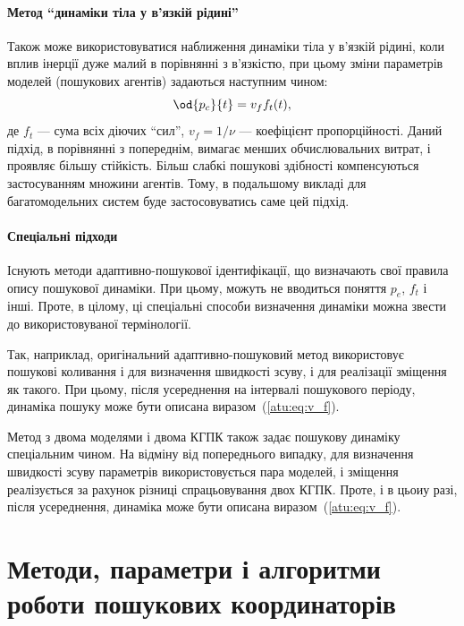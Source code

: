 \paragraph{Метод ``динаміки тіла у в'язкій рідині''}

Також може використовуватися наближення динаміки тіла у в'язкій рідині, коли
вплив інерції дуже малий в порівнянні з в'язкістю, при цьому зміни параметрів
моделей (пошукових агентів) задаються наступним чином:
%
\begin{equation}
  \od{p_c}{t} = v_f f_t(t),
  \label{atu:eq:v_f}
\end{equation}
%
\noindent
де $f_t$ --- сума всіх діючих ``сил'',
$v_f = 1 / \nu$ --- коефіцієнт
пропорційності. Даний підхід, в порівнянні з попереднім, вимагає менших
обчислювальних витрат, і проявляє більшу стійкість. Більш слабкі пошукові
здібності компенсуються застосуванням множини агентів. Тому, в подальшому
викладі для багатомодельних систем буде застосовуватись саме цей підхід.

\paragraph{Спеціальні підходи}

Існують методи адаптивно-пошукової ідентифікації, що визначають
свої правила опису пошукової динаміки. При цьому, можуть не
вводиться поняття
$ p_e $,
$ f_t $ і інші. Проте, в цілому, ці спеціальні способи визначення
динаміки можна звести до використовуваної термінології.

Так, наприклад, оригінальний адаптивно-пошуковий метод
використовує пошукові коливання і для визначення швидкості
зсуву, і для реалізації зміщення як такого. При цьому, після
усереднення на інтервалі пошукового періоду, динаміка пошуку
може бути описана виразом~(\ref{atu:eq:v_f}).

Метод з двома моделями і двома КГПК також задає пошукову
динаміку спеціальним чином. На відміну від попереднього випадку,
для визначення швидкості зсуву параметрів використовується
пара моделей, і зміщення реалізується за рахунок різниці
спрацьовування двох КГПК. Проте, і в цьоиу разі, після усереднення,
динаміка може бути описана виразом~(\ref{atu:eq:v_f}).








\section{Методи, параметри і алгоритми роботи пошукових координаторів} %

